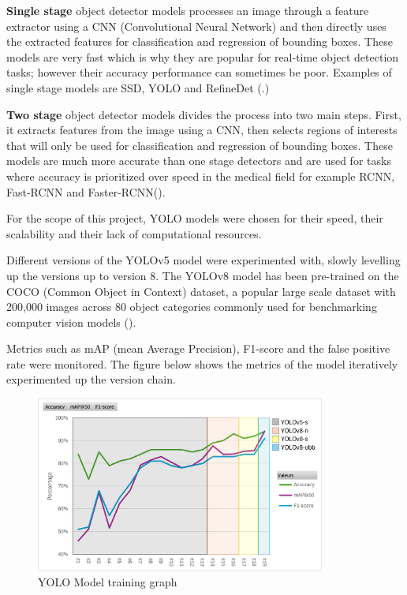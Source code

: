 \newpage{}
\textbf{Single stage} object detector models processes an image through a
feature extractor using a CNN (Convolutional Neural Network) and then directly
uses the extracted features for classification and regression of bounding boxes.
These models are very fast which is why they are popular for real-time object
detection tasks; however their accuracy performance can sometimes be poor.
Examples of single stage models are SSD, YOLO and RefineDet
(\cite{YOLOversionsliterature}.)

\textbf{Two stage} object detector models divides the process into two main
steps. First, it extracts features from the image using a CNN, then selects
regions of interests that will only be used for classification and regression of
bounding boxes. These models are much more accurate than one stage detectors and
are used for tasks where accuracy is prioritized over speed in the medical field
for example RCNN, Fast-RCNN and Faster-RCNN(\cite{singlevstwostagedetectors}).

For the scope of this project, YOLO models were chosen for
their speed, their scalability and their lack of computational resources.

Different versions of the YOLOv5 model were experimented with, slowly
levelling up the versions up to version 8.  The YOLOv8 model has been pre-trained
on the COCO (Common Object in Context) dataset, a popular large scale dataset
with 200,000 images across 80 object categories commonly used for benchmarking
computer vision models (\cite{cocodataset}).

Metrics such as mAP (mean Average Precision), F1-score and the
false positive rate were monitored. The figure below shows the metrics of the model
iteratively experimented up the version chain.

\begin{figure}[htbp]
  \centering
  \includegraphics[width=0.85\textwidth]{images/YOLO-results.png}
  \caption{YOLO Model training graph}
\end{figure}


